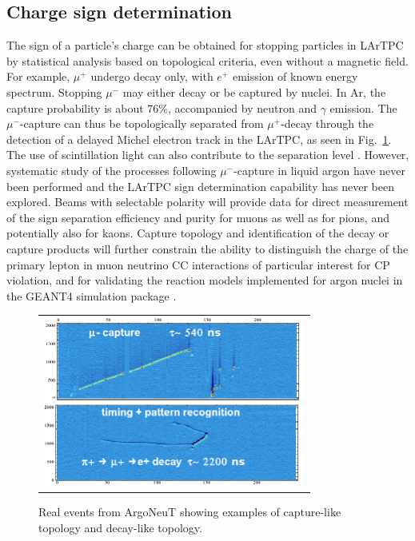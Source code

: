 \documentclass[DIV=calc, paper=a4, fontsize=10pt, twocolumn]{scrartcl}	 %
\begin{document}
{\subsection {Charge sign determination}

The sign of a particle's charge can be obtained for stopping particles in LArTPC by statistical analysis based on topological criteria, even without a magnetic field. For example, $\mu^+$ undergo decay only, with $e^+$ emission of known energy spectrum. Stopping $\mu^-$ may either decay or be captured by nuclei. In Ar, the capture probability is about 76\%, accompanied by neutron and $\gamma$ emission.  The $\mu^-$-capture can thus be topologically separated from $\mu^+$-decay through the detection of a delayed Michel electron track in the LArTPC, as seen in Fig.~\ref{fig:mu-capt-mu-dec}.  The use of scintillation light can also contribute to the separation level \cite{Sorel}.  However, systematic study of the processes following $\mu^-$-capture in liquid argon have never been performed and the LArTPC sign determination capability has never been explored.  Beams with selectable polarity will provide data for direct measurement of the sign separation efficiency and purity for muons as well as for pions, and potentially also for kaons.  Capture topology and identification of the decay or capture products will further constrain the ability to distinguish the charge of the primary lepton in muon neutrino CC interactions of particular interest for CP violation, and for validating the reaction models implemented for argon nuclei in the GEANT4 simulation package \cite{geant4}. 
\begin{figure}[!h]
\begin{centering}
\begin{tabular}{c}
\includegraphics[height=2.2in]{Figures/mu-capture-mu-decay}
\end{tabular}
\vspace{-0.5cm}
\caption{
{\scriptsize \sf Real events from ArgoNeuT showing examples of capture-like topology and decay-like topology. }
}
\label{fig:mu-capt-mu-dec}
\end{centering}
\end{figure}

}
\end{document}

